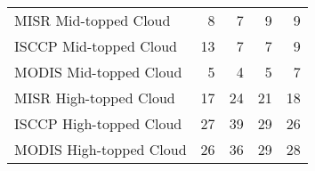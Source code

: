 \begin{tabular}{lrrrr}
   MISR Mid-topped Cloud &                        8 &                        7 &                        9 &                        9 \\
  ISCCP Mid-topped Cloud &                       13 &                        7 &                        7 &                        9 \\
  MODIS Mid-topped Cloud &                        5 &                        4 &                        5 &                        7 \\
  MISR High-topped Cloud &                       17 &                       24 &                       21 &                       18 \\
 ISCCP High-topped Cloud &                       27 &                       39 &                       29 &                       26 \\
 MODIS High-topped Cloud &                       26 &                       36 &                       29 &                       28 \\ \hline
\end{tabular}
